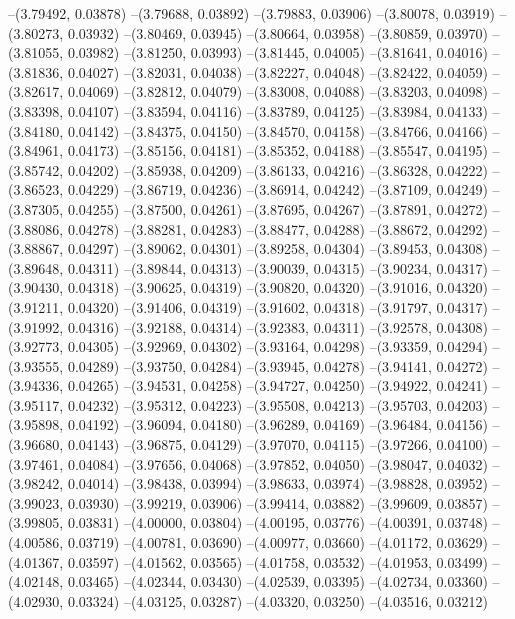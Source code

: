 --(3.79492, 0.03878)
--(3.79688, 0.03892)
--(3.79883, 0.03906)
--(3.80078, 0.03919)
--(3.80273, 0.03932)
--(3.80469, 0.03945)
--(3.80664, 0.03958)
--(3.80859, 0.03970)
--(3.81055, 0.03982)
--(3.81250, 0.03993)
--(3.81445, 0.04005)
--(3.81641, 0.04016)
--(3.81836, 0.04027)
--(3.82031, 0.04038)
--(3.82227, 0.04048)
--(3.82422, 0.04059)
--(3.82617, 0.04069)
--(3.82812, 0.04079)
--(3.83008, 0.04088)
--(3.83203, 0.04098)
--(3.83398, 0.04107)
--(3.83594, 0.04116)
--(3.83789, 0.04125)
--(3.83984, 0.04133)
--(3.84180, 0.04142)
--(3.84375, 0.04150)
--(3.84570, 0.04158)
--(3.84766, 0.04166)
--(3.84961, 0.04173)
--(3.85156, 0.04181)
--(3.85352, 0.04188)
--(3.85547, 0.04195)
--(3.85742, 0.04202)
--(3.85938, 0.04209)
--(3.86133, 0.04216)
--(3.86328, 0.04222)
--(3.86523, 0.04229)
--(3.86719, 0.04236)
--(3.86914, 0.04242)
--(3.87109, 0.04249)
--(3.87305, 0.04255)
--(3.87500, 0.04261)
--(3.87695, 0.04267)
--(3.87891, 0.04272)
--(3.88086, 0.04278)
--(3.88281, 0.04283)
--(3.88477, 0.04288)
--(3.88672, 0.04292)
--(3.88867, 0.04297)
--(3.89062, 0.04301)
--(3.89258, 0.04304)
--(3.89453, 0.04308)
--(3.89648, 0.04311)
--(3.89844, 0.04313)
--(3.90039, 0.04315)
--(3.90234, 0.04317)
--(3.90430, 0.04318)
--(3.90625, 0.04319)
--(3.90820, 0.04320)
--(3.91016, 0.04320)
--(3.91211, 0.04320)
--(3.91406, 0.04319)
--(3.91602, 0.04318)
--(3.91797, 0.04317)
--(3.91992, 0.04316)
--(3.92188, 0.04314)
--(3.92383, 0.04311)
--(3.92578, 0.04308)
--(3.92773, 0.04305)
--(3.92969, 0.04302)
--(3.93164, 0.04298)
--(3.93359, 0.04294)
--(3.93555, 0.04289)
--(3.93750, 0.04284)
--(3.93945, 0.04278)
--(3.94141, 0.04272)
--(3.94336, 0.04265)
--(3.94531, 0.04258)
--(3.94727, 0.04250)
--(3.94922, 0.04241)
--(3.95117, 0.04232)
--(3.95312, 0.04223)
--(3.95508, 0.04213)
--(3.95703, 0.04203)
--(3.95898, 0.04192)
--(3.96094, 0.04180)
--(3.96289, 0.04169)
--(3.96484, 0.04156)
--(3.96680, 0.04143)
--(3.96875, 0.04129)
--(3.97070, 0.04115)
--(3.97266, 0.04100)
--(3.97461, 0.04084)
--(3.97656, 0.04068)
--(3.97852, 0.04050)
--(3.98047, 0.04032)
--(3.98242, 0.04014)
--(3.98438, 0.03994)
--(3.98633, 0.03974)
--(3.98828, 0.03952)
--(3.99023, 0.03930)
--(3.99219, 0.03906)
--(3.99414, 0.03882)
--(3.99609, 0.03857)
--(3.99805, 0.03831)
--(4.00000, 0.03804)
--(4.00195, 0.03776)
--(4.00391, 0.03748)
--(4.00586, 0.03719)
--(4.00781, 0.03690)
--(4.00977, 0.03660)
--(4.01172, 0.03629)
--(4.01367, 0.03597)
--(4.01562, 0.03565)
--(4.01758, 0.03532)
--(4.01953, 0.03499)
--(4.02148, 0.03465)
--(4.02344, 0.03430)
--(4.02539, 0.03395)
--(4.02734, 0.03360)
--(4.02930, 0.03324)
--(4.03125, 0.03287)
--(4.03320, 0.03250)
--(4.03516, 0.03212)
